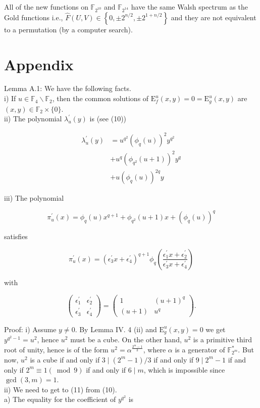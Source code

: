 \documentclass[10pt]{article}
\begin{document}
All of the new functions on $\mathbb{F}_{2^{10}}$ and $\mathbb{F}_{2^{14}}$ have the same Walsh spectrum as the Gold functions i.e., $\widehat{F}(U, V) \in \left\{0, \pm 2^{n / 2}, \pm 2^{1+n / 2}\right\}$ and they are not equivalent to a permutation (by a computer search).

\section*{Appendix}
Lemma A.1: We have the following facts.\\
i) If $u \in \mathbb{F}_{4} \backslash \mathbb{F}_{2}$, then the common solutions of $\mathrm{E}_{f}^{u}(x, y)=0=\mathrm{E}_{g}^{u}(x, y)$ are $(x, y) \in \mathbb{F}_{2} \times\{0\}$.\\
ii) The polynomial $\lambda_{u}^{\prime}(y)$ is (see (10))

$$
\begin{aligned}
\lambda_{u}^{\prime}(y) & =u^{q^{2}}\left(\phi_{q}(u)\right)^{2} y^{q^{2}} \\
& +u^{q}\left(\phi_{q^{2}}(u+1)\right)^{2} y^{q} \\
& +u\left(\phi_{q}(u)\right)^{2 q} y
\end{aligned}
$$

iii) The polynomial

$$
\pi_{u}^{\prime}(x)=\phi_{q}(u) x^{q+1}+\phi_{q^{2}}(u+1) x+\left(\phi_{q}(u)\right)^{q}
$$

satisfies

$$
\pi_{u}^{\prime}(x)=\left(\epsilon_{3}^{\prime} x+\epsilon_{4}^{\prime}\right)^{q+1} \phi_{q}\left(\frac{\epsilon_{1}^{\prime} x+\epsilon_{2}^{\prime}}{\epsilon_{3}^{\prime} x+\epsilon_{4}^{\prime}}\right)
$$

with

$$
\left(\begin{array}{ll}
\epsilon_{1}^{\prime} & \epsilon_{2}^{\prime} \\
\epsilon_{3}^{\prime} & \epsilon_{4}^{\prime}
\end{array}\right)=\left(\begin{array}{cc}
1 & (u+1)^{q} \\
(u+1) & u^{q}
\end{array}\right) .
$$

Proof: i) Assume $y \neq 0$. By Lemma IV. 4 (ii) and $\mathrm{E}_{g}^{u}(x, y)=0$ we get $y^{q^{2}-1}=u^{2}$, hence $u^{2}$ must be a cube. On the other hand, $u^{2}$ is a primitive third root of unity, hence is of the form $u^{2}=\alpha^{\frac{2^{m}-1}{3}}$, where $\alpha$ is a generator of $\mathbb{F}_{2^{m}}^{*}$. But now, $u^{2}$ is a cube if and only if $3 \mid\left(2^{m}-1\right) / 3$ if and only if $9 \mid 2^{m}-1$ if and only if $2^{m} \equiv 1(\bmod 9)$ if and only if $6 \mid m$, which is impossible since $\operatorname{gcd}(3, m)=1$.\\
ii) We need to get to (11) from (10).\\
a) The equality for the coefficient of $y^{q^{2}}$ is
\end{document}
